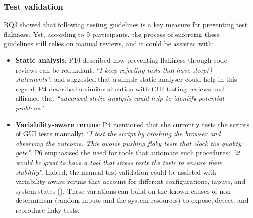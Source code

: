 \subsubsection{\textbf{Test validation}}
\textsc{RQ3} showed that following testing guidelines is a key measure for preventing test flakiness. 
Yet, according to 9 participants, the process of enforcing these guidelines still relies on manual reviews, and it could be assisted with:
\begin{itemize}[wide=10pt,noitemsep,topsep=0pt]
\item \textbf{Static analysis}: P10 described how preventing flakiness through code reviews can be redundant, \textit{``I keep rejecting tests that have sleep() statements"}, and suggested that a simple static analyser could help in this regard.
P4 described a similar situation with GUI testing reviews and affirmed that \textit{``advanced static analysis could help to identify potential problems"}.

\item \textbf{Variability-aware reruns}: 
P4 mentioned that she currently tests the scripts of GUI tests manually: \textit{``I test the script by crashing the browser and observing the outcome. This avoids pushing flaky tests that block the quality gate"}.
P6 emphasised the need for tools that automate such procedures: \textit{``it would be great to have a tool that stress tests the tests to ensure their stability"}.
Indeed, the manual test validation could be assisted with variability-aware reruns that account for different configurations, inputs, and system states (\eg \cite{WongMLK18}).
These variations can build on the known causes of non-determinism (\eg random inputs and the system resources) to expose, detect, and reproduce flaky tests. 

\end{itemize}


